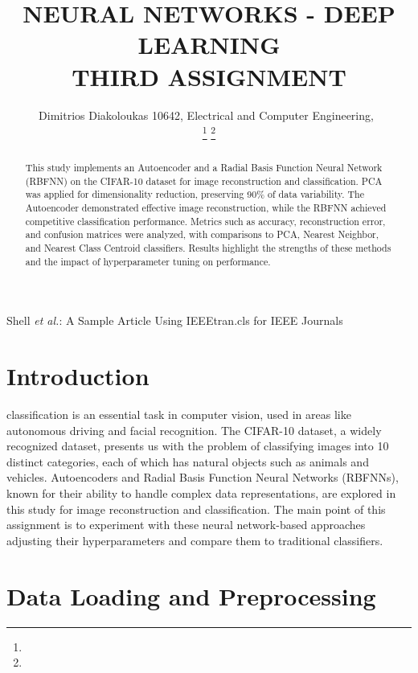 \documentclass[lettersize,journal]{IEEEtran}
\begin{document}
\title{NEURAL NETWORKS - DEEP LEARNING \\ THIRD ASSIGNMENT}

\author{Dimitrios Diakoloukas 10642, Electrical and Computer Engineering,~

\thanks{}
\thanks{}}

%
{Shell \MakeLowercase{\textit{et al.}}: A Sample Article Using IEEEtran.cls for IEEE Journals}

\maketitle

\begin{abstract}
This study implements an Autoencoder and a Radial Basis Function Neural Network (RBFNN) on the CIFAR-10 dataset for image reconstruction and classification. PCA was applied for dimensionality reduction, preserving 90\% of data variability. The Autoencoder demonstrated effective image reconstruction, while the RBFNN achieved competitive classification performance. Metrics such as accuracy, reconstruction error, and confusion matrices were analyzed, with comparisons to PCA, Nearest Neighbor, and Nearest Class Centroid classifiers. Results highlight the strengths of these methods and the impact of hyperparameter tuning on performance.
\end{abstract}

\section{\textbf{Introduction}}
 classification is an essential task in computer vision, used in areas like autonomous driving and facial recognition. The CIFAR-10 dataset, a widely recognized dataset, presents us with the problem of classifying images into 10 distinct categories, each of which has natural objects such as animals and vehicles. Autoencoders and Radial Basis Function Neural Networks (RBFNNs), known for their ability to handle complex data representations, are explored in this study for image reconstruction and classification. The main point of this assignment is to experiment with these neural network-based approaches adjusting their hyperparameters and compare them to traditional classifiers.

\section{\textbf{Data Loading and Preprocessing}}
\end{document}

